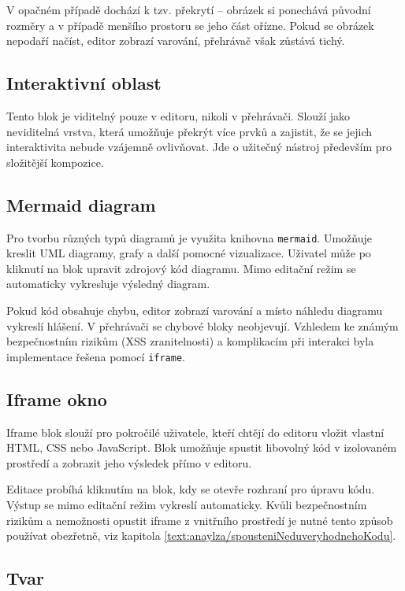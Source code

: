 V opačném případě dochází k tzv. překrytí -- obrázek si ponechává původní rozměry a v případě menšího prostoru se jeho část ořízne.
Pokud se obrázek nepodaří načíst, editor zobrazí varování, přehrávač však zůstává tichý.

\subsection{Interaktivní oblast}

Tento blok je viditelný pouze v editoru, nikoli v přehrávači.
Slouží jako neviditelná vrstva, která umožňuje překrýt více prvků a zajistit, že se jejich interaktivita nebude vzájemně ovlivňovat.
Jde o užitečný nástroj především pro složitější kompozice.

\subsection{Mermaid diagram}

Pro tvorbu různých typů diagramů je využita knihovna \texttt{mermaid}. 
Umožňuje kreslit UML diagramy, grafy a další pomocné vizualizace. 
Uživatel může po kliknutí na blok upravit zdrojový kód diagramu. 
Mimo editační režim se automaticky vykresluje výsledný diagram.

Pokud kód obsahuje chybu, editor zobrazí varování a místo náhledu diagramu vykreslí hlášení.
V přehrávači se chybové bloky neobjevují. 
Vzhledem ke známým bezpečnostním rizikům (XSS zranitelnosti) a komplikacím při interakci byla implementace řešena pomocí \texttt{iframe}.

\subsection{Iframe okno}

Iframe blok slouží pro pokročilé uživatele, kteří chtějí do editoru vložit vlastní HTML, CSS nebo JavaScript. 
Blok umožňuje spustit libovolný kód v izolovaném prostředí a zobrazit jeho výsledek přímo v editoru.

Editace probíhá kliknutím na blok, kdy se otevře rozhraní pro úpravu kódu. 
Výstup se mimo editační režim vykreslí automaticky. 
Kvůli bezpečnostním rizikům a nemožnosti opustit iframe z vnitřního prostředí je nutné tento způsob používat obezřetně, viz kapitola \ref{text:anaylza/spousteniNeduveryhodnehoKodu}.

\subsection{Tvar}

